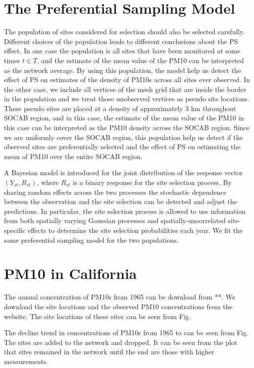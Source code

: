 \section{The Preferential Sampling Model}
The population of sites considered for selection should also be selected carefully.
Different choices of the population leads to different conclusions about the PS effect. 
In one case the population is all sites that have been monitored at some times $t \in T$, and
the estimate of the mean value of the PM10 can be interpreted as the network average.
By using this population, the model help us detect the effect of PS on estimates of the density of 
PM10s across all sites ever observed. 
In the other case, we include all vertices of the mesh grid that are inside the border in the 
population and we treat those unobserved vertices as pseudo site locations. These pseudo sites are
placed at a density of approximately 3 km throughout SOCAB region, and in this case, the estimate 
of the mean value of the PM10 in this case can be interpreted as the PM10 density across the SOCAB
region. Since we are uniformly cover the 
SOCAB region, this population help us detect if the observed sites are preferentially selected and 
the effect of PS on estimating the mean of PM10 over the entire SOCAB region.

A Bayesian model is 
introduced for the joint distribution of the response vector $(Y_{st}, R_{st})$, where $R_{st}$ is
a binary response for the site selection process. By sharing random effects across the two processes
the stochastic dependence between the observation and the site selection can be detected and adjust 
the predictions. In particular, the site selection process is allowed to use information from both
spatially varying Gaussian processes and spatially-uncorrelated site-specific effects to determine
the site selection probabilities each year.
We fit the same preferential sampling model for the two populations.


\section{PM10 in California}
The annual concentration of PM10s from 1965 can be download from **. We download the site locations
and the observed PM10 concentrations from the website. The site locations of these sites can be 
seen from Fig. 

The decline trend in concentrations of PM10s from 1965 to can be seen from Fig. The sites are added 
to the network and dropped. It can be seen from the plot that sites remained in the network until 
the end are those with higher measurements.
